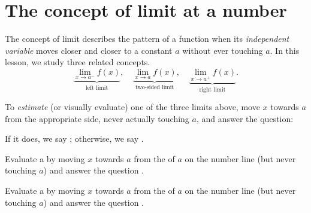 \documentclass[../main.tex]{subfiles}
\begin{document}
 \section{The concept of limit at a number}
The concept of limit describes the pattern of a function when its \emph{independent variable} moves closer and closer to a constant \(a\) without ever touching \(a\). In this lesson, we study three related concepts.
\[
  \underbrace{\lim_{x \to a^{-}} f(x)}_{\text{left limit}},
  \quad
  \underbrace{\lim_{x \to a} f(x)}_{\text{two-sided limit}},
  \quad
  \underbrace{\lim_{x \to a^{+}} f(x)}_{\text{right limit}}.
\]

To \emph{estimate} (or visually evaluate) one of the three limits above, move \(x\) towards \(a\) from the appropriate side, never actually touching \(a\), and answer the question:
\begin{center}
  \faStar{} 
\end{center}
If it does, we say ; otherwise, we say .

\bigskip

\begin{example} \label{eg:left-limits}
  Evaluate a  by moving \(x\) towards \(a\) from the  of \(a\) on the number line (but never touching \(a\)) and answer the question \faStar{}.

  \begin{center}
    
    \qquad
    
    \qquad
    
  \end{center}

  \blanks*
\end{example}

\begin{example} \label{eg:right-limits}
  Evaluate a  by moving \(x\) towards \(a\) from the  of \(a\) on the number line (but never touching \(a\)) and answer the question \faStar{}.

  \begin{center}
    
    \qquad
    
    \qquad
    
  \end{center}

  \blanks*
\end{example}
\clearpage
\end{document}
